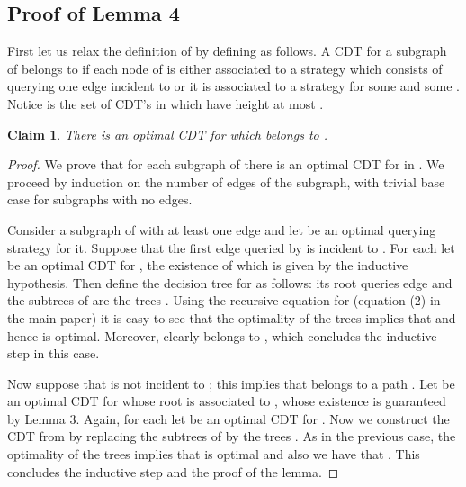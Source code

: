 \documentclass[12pt]{article}
\newtheorem{claim}{Claim}
\newcommand{\ESrecCDT}[0]{2}
\newcommand{\mainLemmaSparse}[0]{3}
\begin{document}
	\subsection{Proof of Lemma 4}
	
		First let us relax the definition of  by defining  as follows. A CDT  for a subgraph  of  belongs to  if each node  of  is either associated to a strategy which consists of querying one edge incident to  or it is associated to a strategy  for some  and some . Notice  is the set of CDT's in  which have height at most .
		
		\begin{claim}
			There is an optimal CDT for  which belongs to .
		\end{claim}
		
		\begin{proof}
			We prove that for each subgraph  of  there is an optimal CDT for  in . We proceed by induction on the number of edges of the subgraph, with trivial base case for subgraphs with no edges. 
			
			Consider a subgraph  of  with at least one edge and let  be an optimal querying strategy for it. Suppose that the first edge  queried by  is incident to . For each  let  be an optimal CDT for , the existence of which is given by the inductive hypothesis. Then define the decision tree  for  as follows: its root queries edge  and the subtrees of  are the trees . Using the recursive equation for  (equation (\ESrecCDT) in the main paper) it is easy to see that the optimality of the trees  implies that  and hence  is optimal. Moreover,  clearly belongs to , which concludes the inductive step in this case.
			
			Now suppose that  is not incident to ; this implies that  belongs to a path . Let  be an optimal CDT for  whose root is associated to , whose existence is guaranteed by Lemma \mainLemmaSparse. Again, for each  let  be an optimal CDT for . Now we construct the CDT  from  by replacing the subtrees of  by the trees . As in the previous case, the optimality of the trees  implies that  is optimal and also we have that . This concludes the inductive step and the proof of the lemma.
		\end{proof}
\end{document}

